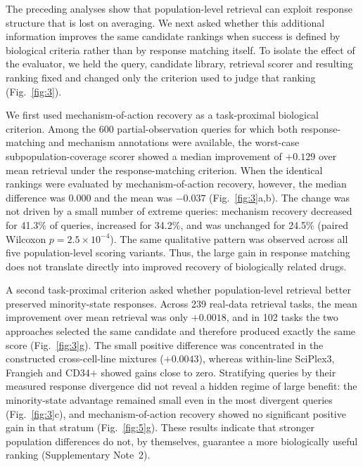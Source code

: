 \documentclass[11pt,letterpaper]{article}
\newcommand{\CLASSBP}{2.5\times10^{-4}} %
\begin{document}
The preceding analyses show that population-level retrieval can exploit response structure that is lost on averaging. We next asked whether this additional information improves the same candidate rankings when success is defined by biological criteria rather than by response matching itself. To isolate the effect of the evaluator, we held the query, candidate library, retrieval scorer and resulting ranking fixed and changed only the criterion used to judge that ranking (Fig.~\ref{fig:3}).

We first used mechanism-of-action recovery as a task-proximal biological criterion. Among the 600 partial-observation queries for which both response-matching and mechanism annotations were available, the worst-case subpopulation-coverage scorer showed a median improvement of $+0.129$ over mean retrieval under the response-matching criterion. When the identical rankings were evaluated by mechanism-of-action recovery, however, the median difference was 0.000 and the mean was $-0.037$ (Fig.~\ref{fig:3}a,b). The change was not driven by a small number of extreme queries: mechanism recovery decreased for 41.3\% of queries, increased for 34.2\%, and was unchanged for 24.5\% (paired Wilcoxon $p=\CLASSBP$). The same qualitative pattern was observed across all five population-level scoring variants. Thus, the large gain in response matching does not translate directly into improved recovery of biologically related drugs.

A second task-proximal criterion asked whether population-level retrieval better preserved minority-state responses. Across 239 real-data retrieval tasks, the mean improvement over mean retrieval was only $+0.0018$, and in 102 tasks the two approaches selected the same candidate and therefore produced exactly the same score (Fig.~\ref{fig:3}g). The small positive difference was concentrated in the constructed cross-cell-line mixtures ($+0.0043$), whereas within-line SciPlex3, Frangieh and CD34$+$ showed gains close to zero. Stratifying queries by their measured response divergence did not reveal a hidden regime of large benefit: the minority-state advantage remained small even in the most divergent queries (Fig.~\ref{fig:3}c), and mechanism-of-action recovery showed no significant positive gain in that stratum (Fig.~\ref{fig:5}g). These results indicate that stronger population differences do not, by themselves, guarantee a more biologically useful ranking (Supplementary Note~2).
\end{document}

